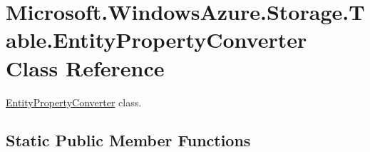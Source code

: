 \hypertarget{classMicrosoft_1_1WindowsAzure_1_1Storage_1_1Table_1_1EntityPropertyConverter}{}\section{Microsoft.\+Windows\+Azure.\+Storage.\+Table.\+Entity\+Property\+Converter Class Reference}
\label{classMicrosoft_1_1WindowsAzure_1_1Storage_1_1Table_1_1EntityPropertyConverter}


\hyperlink{classMicrosoft_1_1WindowsAzure_1_1Storage_1_1Table_1_1EntityPropertyConverter}{Entity\+Property\+Converter} class.  


\subsection*{Static Public Member Functions}
